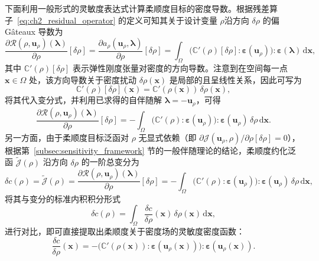 下面利用一般形式的灵敏度表达式计算柔顺度目标的密度导数。根据残差算子~\eqref{eq:ch2_residual_operator} 的定义可知其关于设计变量 $\rho$沿方向 $\delta\rho$ 的偏 Gâteaux 导数为
\[
\frac{\partial\mathcal{R}(\rho,\boldsymbol{u}_\rho)(\boldsymbol{\lambda})}{\partial\rho}[\delta\rho] = \frac{\partial a_\rho(\boldsymbol{u}_\rho,\boldsymbol{\lambda})}{\partial\rho}[\delta\rho] = \int_{\Omega}\big(\mathbb{C}'(\rho)[\delta\rho]: \boldsymbol{\varepsilon}(\boldsymbol{u}_\rho)\big):\boldsymbol{\varepsilon}(\boldsymbol{\lambda})\,\mathrm{d}\boldsymbol{x},
\]
其中 $\mathbb{C}'(\rho)[\delta\rho]$ 表示弹性刚度张量对密度的方向导数。注意到在空间每一点 $\boldsymbol{x}\in\Omega$ 处，该方向导数关于密度扰动 $\delta\rho(\boldsymbol{x})$ 是局部的且呈线性关系，因此可写为
\begin{equation}
	\mathbb{C}'(\rho)[\delta\rho](\boldsymbol{x}) = \mathbb{C}'(\rho(\boldsymbol{x}))\,\delta\rho(\boldsymbol{x}),
	\label{eq:ch2_local_linear_relationship}
\end{equation}
将其代入变分式，并利用已求得的自伴随解 $\boldsymbol{\lambda} = -\boldsymbol{u}_\rho$，可得
\[
\frac{\partial\mathcal{R}(\rho,\boldsymbol{u}_\rho)(\boldsymbol{\lambda})}{\partial\rho}[\delta\rho] = -\int_{\Omega}\big(\mathbb{C}'(\rho): \boldsymbol{\varepsilon}(\boldsymbol{u}_\rho)\big):\boldsymbol{\varepsilon}(\boldsymbol{u}_\rho)\,\delta\rho\,\mathrm{d}\boldsymbol{x}.
\]
另一方面，由于柔顺度目标泛函对 $\rho$ 无显式依赖（即 $\partial\mathcal{J}(\boldsymbol{u}_\rho,\rho)/\partial\rho[\delta\rho]=0$），根据第~\ref{subsec:sensitivity_framework} 节的一般伴随理论的结论，柔顺度约化泛函 $\tilde{\mathcal{J}}(\rho)$ 沿方向 $\delta\rho$ 的一阶总变分为
\[
\delta c(\rho) = \tilde{\mathcal{J}}(\rho) = \frac{\partial\mathcal{R}(\rho,\boldsymbol{u}_\rho)(\boldsymbol{\lambda})}{\partial\rho}[\delta\rho] = -\int_{\Omega}\big(\mathbb{C}'(\rho): \boldsymbol{\varepsilon}(\boldsymbol{u}_\rho)\big):\boldsymbol{\varepsilon}(\boldsymbol{u}_\rho)\,\delta\rho\,\mathrm{d}\boldsymbol{x},
\]
将其与变分的标准内积积分形式
\[
\delta c(\rho) = \int_{\Omega}\frac{\delta c}{\delta\rho}(\boldsymbol{x})\,\delta\rho(\boldsymbol{x})\,\mathrm{d}\boldsymbol{x},
\]
进行对比，即可直接提取出柔顺度关于密度场的灵敏度密度函数：
\begin{equation} \label{eq:ch2_compliance_sensitivity_general}
	\frac{\delta c}{\delta\rho}(\boldsymbol{x}) = -\big(\mathbb{C}'(\rho(\boldsymbol{x})): \boldsymbol{\varepsilon}(\boldsymbol{u}_\rho(\boldsymbol{x}))\big): \boldsymbol{\varepsilon}(\boldsymbol{u}_\rho(\boldsymbol{x})).
\end{equation}

